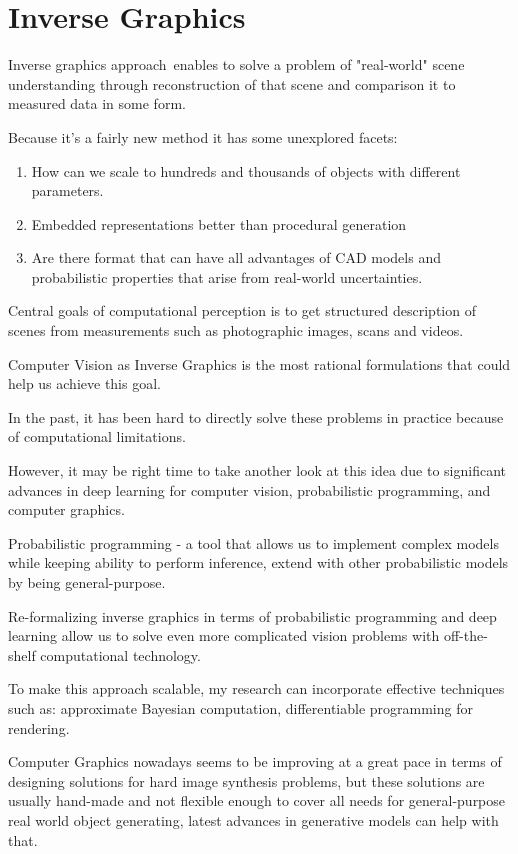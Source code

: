 \section{Inverse Graphics}

Inverse graphics approach~\cite{rezende2016unsupervised,eslami2016attend,kulkarni2015deep,Izadinia_2017_CVPR}enables to solve a problem of "real-world" scene understanding through reconstruction of that scene and comparison it to measured data in some form.

Because it's a fairly new method it has some unexplored facets:
\begin{enumerate}
    \item How can we scale to hundreds and thousands of objects with different parameters.
    \item Embedded representations better than procedural generation
    \item Are there format that can have all advantages of CAD models and probabilistic properties that arise from real-world uncertainties.
\end{enumerate}

Central goals of computational perception is to get structured description of scenes from measurements such as photographic images, scans and videos.

Computer Vision as Inverse Graphics is the most rational formulations that could help us achieve this goal.

In the past, it has been hard to directly solve these problems in practice because of computational limitations.

However, it may be right time to take another look at this idea due to significant advances in deep learning for computer vision, probabilistic programming, and computer graphics.

Probabilistic programming - a tool that allows us to implement complex models while keeping ability to perform inference, extend with other probabilistic models by being general-purpose.

Re-formalizing inverse graphics in terms of probabilistic programming and deep learning allow us to solve even more complicated vision problems with off-the-shelf computational technology.

To make this approach scalable, my research can incorporate effective techniques such as: approximate Bayesian computation, differentiable programming for rendering.

Computer Graphics nowadays seems to be improving at a great pace in terms of designing solutions for hard image synthesis problems, but these solutions are usually hand-made and not flexible enough to cover all needs for general-purpose real world object generating, latest advances in generative models can help with that.

